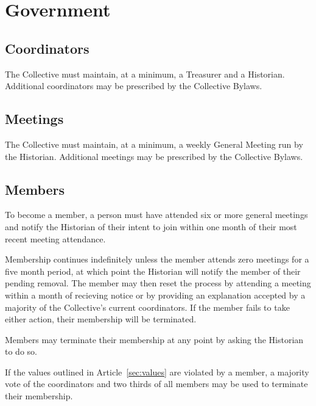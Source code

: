 \chapter{Government}

\section{Coordinators}\label{sec:coordinators}
The Collective must maintain, at a minimum, a Treasurer and a Historian. Additional coordinators may be prescribed by the Collective Bylaws.

\section{Meetings}\label{sec:meetings}
The Collective must maintain, at a minimum, a weekly General Meeting run by the Historian. Additional meetings may be prescribed by the Collective Bylaws.

\section{Members}\label{sec:members}
To become a member, a person must have attended six or more general meetings and notify the Historian of their intent to join within one month of their most recent meeting attendance.

Membership continues indefinitely unless the member attends zero meetings for a five month period, at which point the Historian will notify the member of their pending removal. The member may then reset the process by attending a meeting within a month of recieving notice or by providing an explanation accepted by a majority of the Collective's current coordinators. If the member fails to take either action, their membership will be terminated.

Members may terminate their membership at any point by asking the Historian to do so.

If the values outlined in Article~\ref{sec:values} are violated by a member, a majority vote of the coordinators and two thirds of all members may be used to terminate their membership.
